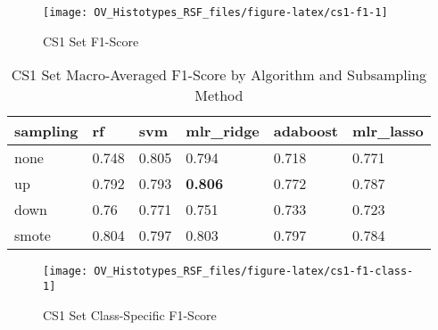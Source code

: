 \documentclass[
]{report}
\begin{document}
\begin{figure}[H]

{\centering \texttt{[image: OV\_Histotypes\_RSF\_files/figure-latex/cs1-f1-1]} 

}

\caption{CS1 Set F1-Score}\label{fig:cs1-f1}
\end{figure}

\begin{table}

\caption{\label{tab:cs1-f1-table}CS1 Set Macro-Averaged F1-Score by Algorithm and Subsampling Method}
\centering
\begin{tabular}[t]{l|l|l|l|l|l}
\hline
sampling & rf & svm & mlr\_ridge & adaboost & mlr\_lasso\\
\hline
none & 0.748 & 0.805 & 0.794 & 0.718 & 0.771\\
\hline
up & 0.792 & 0.793 & \textbf{0.806} & 0.772 & 0.787\\
\hline
down & 0.76 & 0.771 & 0.751 & 0.733 & 0.723\\
\hline
smote & 0.804 & 0.797 & 0.803 & 0.797 & 0.784\\
\hline
\end{tabular}
\end{table}

\begin{figure}[H]

{\centering \texttt{[image: OV\_Histotypes\_RSF\_files/figure-latex/cs1-f1-class-1]} 

}

\caption{CS1 Set Class-Specific F1-Score}\label{fig:cs1-f1-class}
\end{figure}
\end{document}
